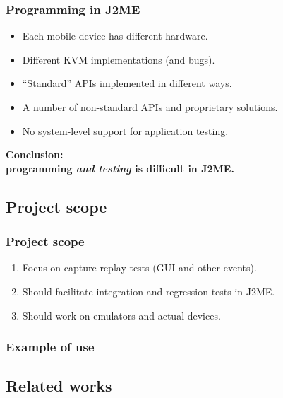 \documentclass[compress]{beamer}
\begin{document}
\begin{frame}
    \frametitle{Programming in J2ME}

	\begin{itemize}
        \item Each mobile device has different hardware.
        \item Different KVM implementations (and bugs).
        \item ``Standard'' APIs implemented in different ways.
        \item A number of non-standard APIs and proprietary solutions.
        \item No system-level support for application testing.
	\end{itemize}

    \medskip
    \begin{center}\large\bfseries
    Conclusion:\\programming \emph{and testing} is difficult in J2ME.
    \end{center}
\end{frame}


\subsection[Scope]{Project scope} %

\begin{frame}
    \frametitle{Project scope}

	\begin{enumerate}
        \item Focus on capture-replay tests (GUI and other events).
        \item Should facilitate integration and regression tests in J2ME.
        \item Should work on emulators and actual devices.
	\end{enumerate}
\end{frame}

\begin{frame}[plain]
    \frametitle{Example of use}

\end{frame}


\subsection[Related]{Related works} %
\end{document}
